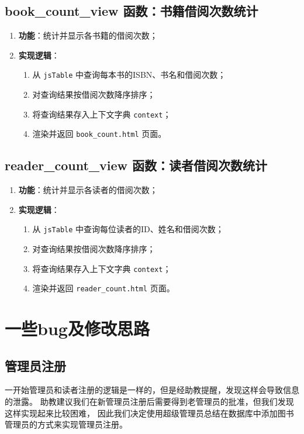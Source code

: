 \documentclass{ctexart}
\begin{document}
\subsection{book\_count\_view 函数：书籍借阅次数统计}
\begin{enumerate}
    \item \textbf{功能}：统计并显示各书籍的借阅次数；
    \item \textbf{实现逻辑}：
    \begin{enumerate}
        \item 从 \texttt{jsTable} 中查询每本书的ISBN、书名和借阅次数；
        \item 对查询结果按借阅次数降序排序；
        \item 将查询结果存入上下文字典 \texttt{context}；
        \item 渲染并返回 \texttt{book\_count.html} 页面。
    \end{enumerate}
\end{enumerate}

\subsection{reader\_count\_view 函数：读者借阅次数统计}
\begin{enumerate}
    \item \textbf{功能}：统计并显示各读者的借阅次数；
    \item \textbf{实现逻辑}：
    \begin{enumerate}
        \item 从 \texttt{jsTable} 中查询每位读者的ID、姓名和借阅次数；
        \item 对查询结果按借阅次数降序排序；
        \item 将查询结果存入上下文字典 \texttt{context}；
        \item 渲染并返回 \texttt{reader\_count.html} 页面。
    \end{enumerate}
\end{enumerate}
	\section{一些bug及修改思路}
	\subsection{管理员注册}
    一开始管理员和读者注册的逻辑是一样的，但是经助教提醒，发现这样会导致信息的泄露。
    助教建议我们在新管理员注册后需要得到老管理员的批准，但我们发现这样实现起来比较困难，
    因此我们决定使用超级管理员总结在数据库中添加图书管理员的方式来实现管理员注册。
\end{document}
